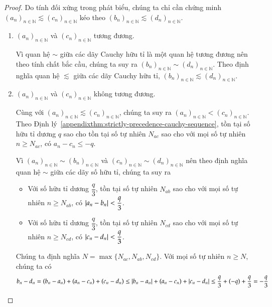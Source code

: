 \begin{proof}
    Do tính đối xứng trong phát biểu, chúng ta chỉ cần chứng minh ${(a_{n})}_{n\in\mathbb{N}}\lesssim {(c_{n})}_{n\in\mathbb{N}}$ kéo theo ${(b_{n})}_{n\in\mathbb{N}}\lesssim {(d_{n})}_{n\in\mathbb{N}}$.

    \begin{enumerate}[label={\textbf{Trường hợp \arabic*.}},itemindent=2cm]
        \item ${(a_{n})}_{n\in\mathbb{N}}$ và ${(c_{n})}_{n\in\mathbb{N}}$ tương đương.

              Vì quan hệ $\sim$ giữa các dãy Cauchy hữu tỉ là một quan hệ tương đương nên theo tính chất bắc cầu, chúng ta suy ra ${(b_{n})}_{n\in\mathbb{N}}\sim {(d_{n})}_{n\in\mathbb{N}}$. Theo định nghĩa quan hệ $\lesssim$ giữa các dãy Cauchy hữu tỉ, ${(b_{n})}_{n\in\mathbb{N}}\lesssim {(d_{n})}_{n\in\mathbb{N}}$.

        \item ${(a_{n})}_{n\in\mathbb{N}}$ và ${(c_{n})}_{n\in\mathbb{N}}$ không tương đương.

              Cùng với ${(a_{n})}_{n\in\mathbb{N}}\lesssim {(c_{n})}_{n\in\mathbb{N}}$, chúng ta suy ra ${(a_{n})}_{n\in\mathbb{N}} < {(c_{n})}_{n\in\mathbb{N}}$.  Theo Định lý~\ref{appendixthm:strictly-precedence-cauchy-sequence}, tồn tại số hữu tỉ dương $q$ sao cho tồn tại số tự nhiên $N_{ac}$ sao cho với mọi số tự nhiên $n\geq N_{ac}$, có $a_{n} - c_{n}\leq -q$.

              Vì ${(a_{n})}_{n\in\mathbb{N}}\sim {(b_{n})}_{n\in\mathbb{N}}$ và ${(c_{n})}_{n\in\mathbb{N}}\sim {(d_{n})}_{n\in\mathbb{N}}$ nên theo định nghĩa quan hệ $\sim$ giữa các dãy số hữu tỉ, chúng ta suy ra
              \begin{itemize}
                  \item Với số hữu tỉ dương $\dfrac{q}{3}$, tồn tại số tự nhiên $N_{ab}$ sao cho với mọi số tự nhiên $n\geq N_{ab}$, có $\left\vert{a_{n} - b_{n}}\right\vert < \dfrac{q}{3}$.
                  \item Với số hữu tỉ dương $\dfrac{q}{3}$, tồn tại số tự nhiên $N_{cd}$ sao cho với mọi số tự nhiên $n\geq N_{cd}$, có $\left\vert{c_{n} - d_{n}}\right\vert < \dfrac{q}{3}$.
              \end{itemize}

              Chúng ta định nghĩa $N = \max\{ N_{ac}, N_{ab}, N_{cd} \}$. Với mọi số tự nhiên $n\geq N$, chúng ta có
              \[
                  b_{n} - d_{n} = (b_{n} - a_{n}) + (a_{n} - c_{n}) + (c_{n} - d_{n}) \leq \left\vert{b_{n} - a_{n}}\right\vert + (a_{n} - c_{n}) + \left\vert{c_{n} - d_{n}}\right\vert \leq \frac{q}{3} + (-q) + \frac{q}{3} = -\frac{q}{3}
              \]


\end{enumerate}
\end{proof}
